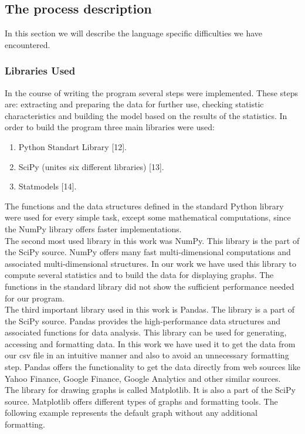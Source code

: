 \documentclass [twoside,
  11pt, a4paper,
  footinclude=true,
  headinclude=true,
  cleardoublepage=empty
]{article}
\begin{document}
\subsection{The process description}
In this section we will describe the language specific difficulties we have encountered.
\subsubsection{Libraries Used}
In the course of writing the program several steps were implemented. These steps are: extracting and preparing the data for further use, checking statistic characteristics and building the model based on the results of the statistics. In order to build the program three main libraries were used:
\begin{enumerate}
    \item Python Standart Library [12].
    \item SciPy (unites six different libraries) [13].
    \item Statmodels [14].
\end{enumerate}
The functions and the data structures defined in the standard Python library were used for every simple task, except some mathematical computations, since the NumPy library offers faster implementations.\\
The second most used library in this work was NumPy. This library is the part of the SciPy source. NumPy offers many fast multi-dimensional computations and associated multi-dimensional structures. In our work we have used this library to compute several statistics and to build the data for displaying graphs. The functions in the standard library did not show the sufficient performance needed for our program.\\
The third important library used in this work is Pandas. The library is a part of the SciPy source. Pandas provides the high-performance data structures and associated functions for data analysis. This library can be used for generating, accessing and formatting data. In this work we have used it to get the data from our csv file in an intuitive manner and also to avoid an unnecessary formatting step. Pandas offers the functionality to get the data directly from web sources like Yahoo Finance, Google Finance, Google Analytics and other similar sources.\\
The library for drawing graphs is called Matplotlib. It is also a part of the SciPy source. Matplotlib offers different types of graphs and formatting tools. The following example represents the default graph without any additional formatting.
\end{document}
